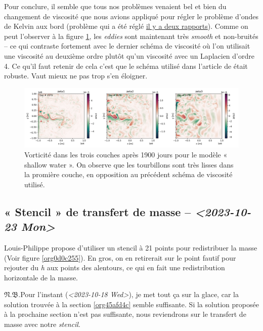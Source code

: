 \documentclass[10pt]{article}
\numberwithin{equation}{section}
\newcommand{\pt}{\hspace{1pt}} %
\newcommand{\nb}{\underline{{\footnotesize\EightStarConvex}\pt $\mathfrak{N.B.}$\vphantom{p}}\hspace{3pt}}
\begin{document}
Pour conclure, il semble que tous nos problèmes venaient bel et bien du changement de viscosité que nous avions appliqué pour régler le problème d'ondes de Kelvin aux bord (problème qui a été réglé \href{rapport-2023-10-06.pdf}{il y a deux rapports}).
Comme on peut l'observer à la figure \ref{fig:org9a8de7f}, les \emph{eddies} sont maintenant très \emph{smooth} et non-bruités -- ce qui contraste fortement avec le dernier schéma de viscosité où l'on utilisait une viscosité au deuxième ordre plutôt qu'un viscosité avec un Laplacien d'ordre 4.
Ce qu'il faut retenir de cela c'est que le schéma utilisé dans l'article de \Textcite{chen_2021} était robuste.
Vaut mieux ne pas trop s'en éloigner. 

\begin{figure}[htbp]
\centering
\includegraphics[width=.9\linewidth]{figures/debuggage/2023_10_17_smooth_zeta.png}
\caption{\label{fig:org9a8de7f}Vorticité dans les trois couches après 1900 jours pour le modèle « shallow water ». On observe que les tourbillons sont très lisses dans la promière couche, en opposition au précédent schéma de viscosité utilisé.}
\end{figure}


\subsection{« Stencil » de transfert de masse -- \textit{<2023-10-23 Mon>}}
\label{sec:org392bb24}
\label{org088b10b}

Louis-Philippe propose d'utiliser un stencil à 21 points pour redistribuer la masse (Voir figure \ref{org0d0c255}).
En gros, on en retirerait sur le point fautif pour rejouter du \emph{h} aux points des alentours, ce qui en fait une redistribution horizontale de la masse.\bigskip

\nb Pour l'instant (\textit{<2023-10-18 Wed>}), je met tout ça sur la glace, car la solution trouvée à la section \ref{org45afd4c} semble suffisante.
Si la solution proposée à la prochaine section n'est pas suffisante, nous reviendrons sur le transfert de masse avec notre \emph{stencil}. 
\end{document}
